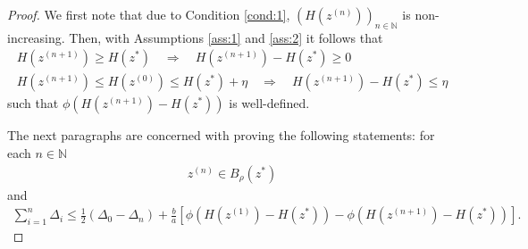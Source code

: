 \documentclass[onecolumn,final,a4paper,13pt,reqno]{siamart}
\begin{document}
\begin{proof}
	We first note that due to Condition \ref{cond:1}, $(H(z^{(n)}))_{n \in \mathbb{N}}$ is non-increasing. Then, with Assumptions \ref{ass:1} and \ref{ass:2} it follows that
	\begin{align}
		H(z^{(n + 1)}) \geq H(z^\ast) \quad\Rightarrow\quad H(z^{(n + 1)}) - H(z^\ast) \geq 0\\
		H(z^{(n + 1)}) \leq H(z^{(0)}) \leq H(z^\ast) + \eta\quad\Rightarrow \quad H(z^{(n + 1)}) - H(z^\ast) \leq \eta
	\end{align}
	such that $\phi(H(z^{(n + 1)}) - H(z^\ast))$ is well-defined.
	
	The next paragraphs are concerned with proving the following statements: for each $n \in \mathbb{N}$
	\begin{align}
		z^{(n)} \in B_\rho(z^\ast)\label{eq:lemma-claim-2}
	\end{align}
	and
	\begin{align}
		\sum_{i = 1}^n \Delta_i \leq \frac{1}{2} (\Delta_0 - \Delta_n) + \frac{b}{a} [\phi(H(z^{(1)}) - H(z^\ast)) - \phi(H(z^{(n + 1)}) - H(z^\ast))].\label{eq:lemma-claim-3}
	\end{align}
	

\end{proof}
\end{document}

